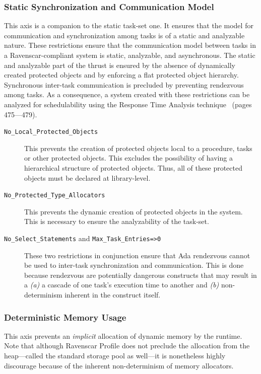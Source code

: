 \subsubsection{Static Synchronization and Communication Model}
This axis is a companion to the static task-set one. It ensures that
the model for communication and synchronization among tasks is of a
static and analyzable nature. These restrictions ensure that the
communication model between tasks in a Ravenscar-compliant system is
static, analyzable, and asynchronous. The static and analyzable part
of the thrust is ensured by the absence of dynamically created
protected objects and by enforcing a flat protected object
hierarchy. Synchronous inter-task communication is precluded by
preventing rendezvous among tasks. As a consequence, a system created
with these restrictions can be analyzed for schedulability using the
Response Time Analysis technique~\cite{burns-rtspl} (pages 475---479).

\begin{description}
\item[\texttt{No\_Local\_Protected\_Objects}] This prevents the
creation of protected objects local to a procedure, tasks or other
protected objects. This excludes the possibility of having a
hierarchical structure of protected objects. Thus, all of these
protected objects must be declared at library-level.

\item[\texttt{No\_Protected\_Type\_Allocators}] This prevents the
  dynamic creation of protected objects in the system. This is
  necessary to ensure the analyzability of the task-set.

\item[\texttt{No\_Select\_Statements} and
  \texttt{Max\_Task\_Entries=>0}] These two restrictions in
  conjunction ensure that Ada rendezvous cannot be used to inter-task
  synchronization and communication. This is done because rendezvous
  are potentially dangerous constructs that may result in a \emph{(a)}
  a cascade of one task's execution time to another and \emph{(b)}
  non-determinism inherent in the construct itself.
\end{description}

\subsubsection{Deterministic Memory Usage}
This axis prevents an \emph{implicit} allocation of dynamic memory by
the runtime. Note that although Ravenscar Profile does not preclude
the allocation from the heap---called the standard storage pool as
well---it is nonetheless highly discourage because of the inherent
non-determinism of memory allocators.

